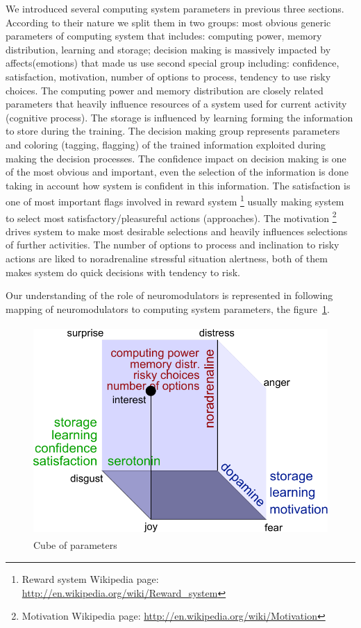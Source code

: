 We introduced several computing system parameters in previous three sections. According to their nature we split them in two groups: most obvious generic parameters of computing system that includes: computing power, memory distribution, learning and storage; decision making is massively impacted by affects(emotions) that made us use second special group including: confidence, satisfaction, motivation, number of options to process, tendency to use risky choices. The computing power and memory distribution are closely related parameters that heavily influence resources of a system used for current activity (cognitive process). The storage is influenced by learning forming the information to store during the training. The decision making group represents parameters and coloring (tagging, flagging) of the trained information exploited during making the decision processes. The confidence impact on decision making is one of the most obvious and important, even the selection of the information is done taking in account how system is confident in this information. The satisfaction is one of most important flags involved in reward system \footnote{Reward system Wikipedia page: \url{http://en.wikipedia.org/wiki/Reward_system}} usually making system to select most satisfactory/pleasureful actions (approaches). The motivation \footnote{Motivation Wikipedia page: \url{http://en.wikipedia.org/wiki/Motivation}} drives system to make most desirable selections and heavily influences selections of further activities. The number of options to process and inclination to risky actions are liked to noradrenaline stressful situation alertness, both of them makes system do quick decisions with tendency to risk.

Our understanding of the role of neuromodulators  is represented in following mapping of neuromodulators to computing system parameters, the figure~\ref{cube_of_parameters}.

\begin{figure}
\begin{center}
 \includegraphics[height=8cm]{figure3_cube_of_parameters}
\end{center}
\caption{Cube of parameters}
\label{cube_of_parameters}
\end{figure}

